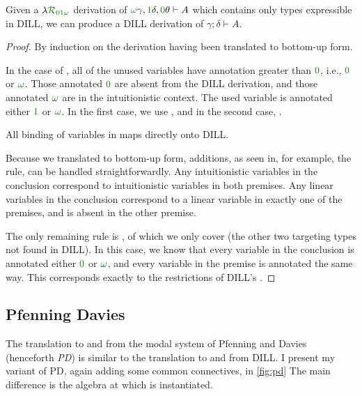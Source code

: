 \begin{proposition}
  Given a $\name_{\instDILL}$ derivation of
  $\gr\omega\gamma, \gr1\delta,
  \gr0\theta \vdash A$ which contains only types expressible
  in DILL, we can produce a DILL derivation of $\gamma; \delta \vdash A$.
\end{proposition}
\begin{proof}
  By induction on the derivation having been translated to bottom-up form.

  In the case of , all of the unused variables have annotation
  greater than $\gr0$, i.e., $\gr0$ or $\gr\omega$.
  Those annotated $\gr0$ are absent from the DILL derivation, and those
  annotated $\gr\omega$ are in the intuitionistic context.
  The used variable is annotated either $\gr1$ or $\gr\omega$.
  In the first case, we use , and in the second case,
  .

  All binding of variables in \name{} maps directly onto DILL\@.

  Because we translated to bottom-up form, additions, as seen in, for example,
  the  rule, can be handled straightforwardly.
  Any intuitionistic variables in the conclusion correspond to intuitionistic
  variables in both premises.
  Any linear variables in the conclusion correspond to a linear variable in
  exactly one of the premises, and is absent in the other premise.

  The only remaining rule is , of which we only cover
   (the other two targeting types not found
  in DILL).
  In this case, we know that every variable in the conclusion is annotated
  either $\gr0$ or $\gr\omega$, and every variable in the premise is
  annotated the same way.
  This corresponds exactly to the restrictions of DILL's .
\end{proof}

\subsection{Pfenning Davies}\label{sec:pd}

The translation to and from the modal system of Pfenning and Davies
\cite{judgmental} (henceforth \emph{PD}) is similar to the translation to and
from DILL\@.
I present my variant of PD, again adding some common connectives, in
\cref{fig:pd}
The main difference is the algebra at which \name{} is instantiated.

